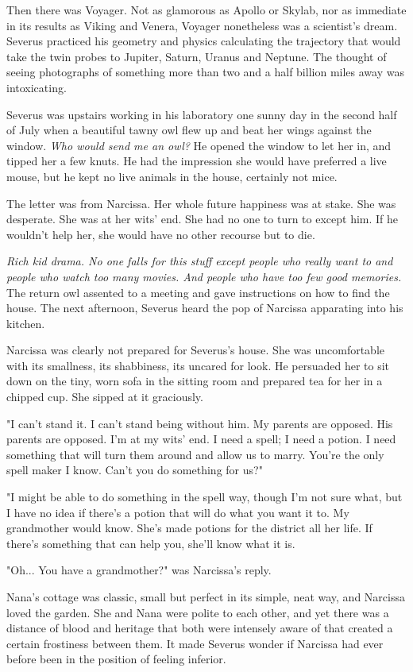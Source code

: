 \documentclass[a4paper,11pt]{article}
\begin{document}
Then there was Voyager. Not as glamorous as Apollo or Skylab, nor as immediate in its results as Viking and Venera, Voyager nonetheless was a scientist's dream. Severus practiced his geometry and physics calculating the trajectory that would take the twin probes to Jupiter, Saturn, Uranus and Neptune. The thought of seeing photographs of something more than two and a half billion miles away was intoxicating.

Severus was upstairs working in his laboratory one sunny day in the second half of July when a beautiful tawny owl flew up and beat her wings against the window. \emph{Who would send me an owl?} He opened the window to let her in, and tipped her a few knuts. He had the impression she would have preferred a live mouse, but he kept no live animals in the house, certainly not mice.

The letter was from Narcissa. Her whole future happiness was at stake. She was desperate. She was at her wits' end. She had no one to turn to except him. If he wouldn't help her, she would have no other recourse but to die.

\emph{Rich kid drama. No one falls for this stuff except people who really want to and people who watch too many movies. And people who have too few good memories.} The return owl assented to a meeting and gave instructions on how to find the house. The next afternoon, Severus heard the pop of Narcissa apparating into his kitchen.

Narcissa was clearly not prepared for Severus's house. She was uncomfortable with its smallness, its shabbiness, its uncared for look. He persuaded her to sit down on the tiny, worn sofa in the sitting room and prepared tea for her in a chipped cup. She sipped at it graciously.

"I can't stand it. I can't stand being without him. My parents are opposed. His parents are opposed. I'm at my wits' end. I need a spell; I need a potion. I need something that will turn them around and allow us to marry. You're the only spell maker I know. Can't you do something for us?"

"I might be able to do something in the spell way, though I'm not sure what, but I have no idea if there's a potion that will do what you want it to. My grandmother would know. She's made potions for the district all her life. If there's something that can help you, she'll know what it is.

"Oh... You have a grandmother?" was Narcissa's reply.

Nana's cottage was classic, small but perfect in its simple, neat way, and Narcissa loved the garden. She and Nana were polite to each other, and yet there was a distance of blood and heritage that both were intensely aware of that created a certain frostiness between them. It made Severus wonder if Narcissa had ever before been in the position of feeling inferior.
\end{document}
